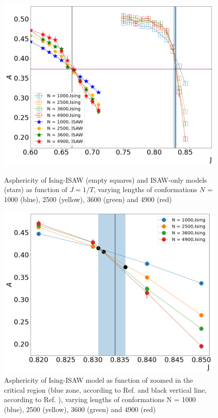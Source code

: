\begin{figure}[h!]
    \begin{minipage}{0.48\textwidth}
        \includegraphics[width=\textwidth]{Images/Ising_ISAW_A_J_Full.png}
        \caption{Asphericity of Ising-ISAW (empty squares) and ISAW-only models (stars) as function of $J=1/T$, varying lengths of conformations $N$ = 1000 (blue), 2500 (yellow), 3600 (green) and 4900 (red)}
        \label{fig:Ising&ISAW_A_J}
    \end{minipage}
    \hfill
    \begin{minipage}{0.48\textwidth}
        \includegraphics[width=\textwidth]{Images/Ising_A_J_Close.png}
        \caption{Asphericity of Ising-ISAW model as function of zoomed in the critical region (blue zone, according to Ref. \cite{Foster2021} and black vertical line, according to Ref. \cite{faizullina2021critical}), varying lengths of conformations N = 1000 (blue), 2500 (yellow), 3600 (green) and 4900 (red)}
        \label{fig:Ising_A_J}
    \end{minipage}
\end{figure}

